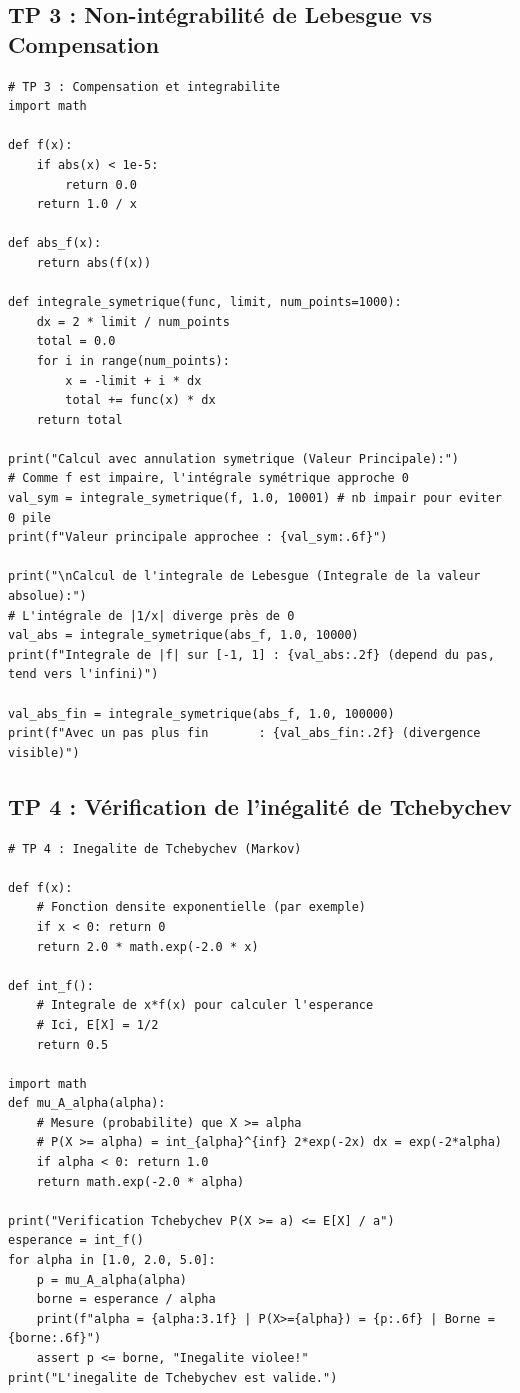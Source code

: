 \documentclass[11pt,a4paper]{article}
\begin{document}
\subsection*{TP 3 : Non-intégrabilité de Lebesgue vs Compensation}
\begin{lstlisting}
# TP 3 : Compensation et integrabilite
import math

def f(x):
    if abs(x) < 1e-5:
        return 0.0
    return 1.0 / x

def abs_f(x):
    return abs(f(x))

def integrale_symetrique(func, limit, num_points=1000):
    dx = 2 * limit / num_points
    total = 0.0
    for i in range(num_points):
        x = -limit + i * dx
        total += func(x) * dx
    return total

print("Calcul avec annulation symetrique (Valeur Principale):")
# Comme f est impaire, l'intégrale symétrique approche 0
val_sym = integrale_symetrique(f, 1.0, 10001) # nb impair pour eviter 0 pile
print(f"Valeur principale approchee : {val_sym:.6f}")

print("\nCalcul de l'integrale de Lebesgue (Integrale de la valeur absolue):")
# L'intégrale de |1/x| diverge près de 0
val_abs = integrale_symetrique(abs_f, 1.0, 10000)
print(f"Integrale de |f| sur [-1, 1] : {val_abs:.2f} (depend du pas, tend vers l'infini)")

val_abs_fin = integrale_symetrique(abs_f, 1.0, 100000)
print(f"Avec un pas plus fin       : {val_abs_fin:.2f} (divergence visible)")
\end{lstlisting}

\subsection*{TP 4 : Vérification de l'inégalité de Tchebychev}
\begin{lstlisting}
# TP 4 : Inegalite de Tchebychev (Markov)

def f(x):
    # Fonction densite exponentielle (par exemple)
    if x < 0: return 0
    return 2.0 * math.exp(-2.0 * x)

def int_f():
    # Integrale de x*f(x) pour calculer l'esperance
    # Ici, E[X] = 1/2
    return 0.5

import math
def mu_A_alpha(alpha):
    # Mesure (probabilite) que X >= alpha
    # P(X >= alpha) = int_{alpha}^{inf} 2*exp(-2x) dx = exp(-2*alpha)
    if alpha < 0: return 1.0
    return math.exp(-2.0 * alpha)

print("Verification Tchebychev P(X >= a) <= E[X] / a")
esperance = int_f()
for alpha in [1.0, 2.0, 5.0]:
    p = mu_A_alpha(alpha)
    borne = esperance / alpha
    print(f"alpha = {alpha:3.1f} | P(X>={alpha}) = {p:.6f} | Borne = {borne:.6f}")
    assert p <= borne, "Inegalite violee!"
print("L'inegalite de Tchebychev est valide.")
\end{lstlisting}
\end{document}
